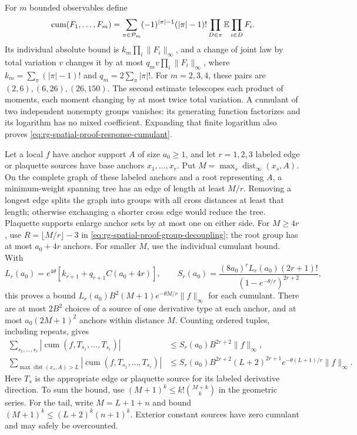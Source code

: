 For \(m\) bounded observables define
\begin{equation}
 \operatorname{cum}(F_1,\ldots,F_m)
 =\sum_{\pi\in\mathcal P_m}(-1)^{|\pi|-1}(|\pi|-1)!
                              \prod_{D\in\pi}\mathbb E\prod_{i\in D}F_i.
 \label{eq:rg-spatial-proof-response-cumulant}
\end{equation}
Its individual absolute bound is \(k_m\prod_i\|F_i\|_\infty\), and a
change of joint law by total variation \(v\) changes it by at most
\(q_m v\prod_i\|F_i\|_\infty\), where
\(k_m=\sum_\pi(|\pi|-1)!\) and \(q_m=2\sum_\pi|\pi|!\).
For \(m=2,3,4\), these pairs are \((2,6),(6,26),(26,150)\).
The second estimate telescopes each product of moments, each moment
changing by at most twice total variation. A cumulant of two independent
nonempty groups vanishes: its generating function factorizes and its
logarithm has no mixed coefficient. Expanding that finite logarithm also
proves \cref{eq:rg-spatial-proof-response-cumulant}.

Let a local \(f\) have anchor support \(A\) of size \(a_0\ge1\), and
let \(r=1,2,3\) labeled edge or plaquette sources have base anchors
\(x_1,\ldots,x_r\). Put \(M=\max_s\operatorname{dist}_\infty(x_s,A)\).
On the complete graph of these labeled anchors and a root representing
\(A\), a minimum-weight spanning tree has an edge of length at least
\(M/r\). Removing a longest edge splits the graph into groups with all
cross distances at least that length; otherwise exchanging a shorter
cross edge would reduce the tree. Plaquette supports enlarge anchor sets
by at most one on either side. For \(M\ge4r\), use
\(R=\lfloor M/r\rfloor-3\) in
\cref{eq:rg-spatial-proof-group-decoupling}; the root group has at most
\(a_0+4r\) anchors. For smaller \(M\), use the individual cumulant
bound. With
\begin{equation}
 L_r(a_0)=e^{4\theta}[k_{r+1}+q_{r+1}C(a_0+4r)],\qquad
 S_r(a_0)=\frac{(8a_0)^rL_r(a_0)(2r+1)!}
                  {(1-e^{-\theta/r})^{2r+2}},
 \label{eq:rg-spatial-proof-response-constants}
\end{equation}
this proves a bound
\(L_r(a_0)B^2(M+1)e^{-\theta M/r}\|f\|_\infty\) for each cumulant.
There are at most \(2B^2\) choices of a source of one derivative type at
each anchor, and at most \(a_0(2M+1)^2\) anchors within distance \(M\).
Counting ordered tuples, including repeats, gives
\begin{equation}
 \begin{split}
 \sum_{s_1,\ldots,s_r}|\operatorname{cum}(f,T_{s_1},\ldots,T_{s_r})|
 &\le S_r(a_0)B^{2r+2}\|f\|_\infty,\\
 \sum_{\max\operatorname{dist}(x_s,A)>L}
       |\operatorname{cum}(f,T_{s_1},\ldots,T_{s_r})|
 &\le S_r(a_0)B^{2r+2}(L+2)^{2r+1}
                     e^{-\theta(L+1)/r}\|f\|_\infty.
 \end{split}
 \label{eq:rg-spatial-proof-response-tails}
\end{equation}
Here \(T_s\) is the appropriate edge or plaquette source for its labeled
derivative direction. To sum the bound, use
\((M+1)^k\le k!{M+k\choose k}\) in the geometric series. For the tail,
write \(M=L+1+n\) and bound
\((M+1)^k\le(L+2)^k(n+1)^k\). Exterior constant sources have zero
cumulant and may safely be overcounted.

